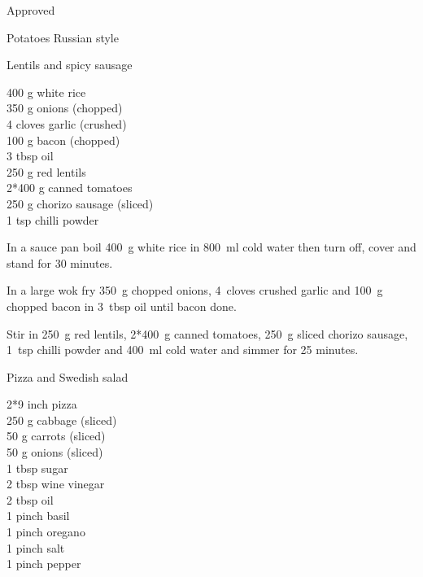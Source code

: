 \begin{menu}{Approved}
\begin{recipe}{2}{Potatoes Russian style}
\begin{instructions}
    \end{instructions}
    \end{recipe}%
  
    \begin{recipe}{2}{Lentils and spicy sausage}%
    
		\begin{ingredients}
		400 g white rice  \\
	350 g onions (chopped) \\
	4 cloves garlic (crushed) \\
	100 g bacon (chopped) \\
	3 tbsp oil  \\
	250 g red lentils  \\
	2*400 g canned tomatoes  \\
	250 g chorizo sausage (sliced) \\
	1 tsp chilli powder  \\
	
		\end{ingredients}
	
    \begin{instructions}
    \item 
      In a
      sauce pan
      boil
      400~g  white rice
      in
      800~ml  cold water
      then turn off, cover and stand for 30 minutes.
    \item 
        In a large wok fry
        350~g chopped onions,
        4~cloves crushed garlic
        and
        100~g chopped bacon
        in
        3~tbsp  oil
        until bacon done.
      \item 
        Stir in
        250~g  red lentils,
        2*400~g  canned tomatoes,
        250~g sliced chorizo sausage,
        1~tsp  chilli powder
        and
        400~ml  cold water
        and simmer for 25 minutes.
      
    \end{instructions}
    \end{recipe}%
  
    \begin{recipe}{1}{Pizza and Swedish salad}%
    
		\begin{ingredients}
		2*9 inch pizza  \\
	250 g cabbage (sliced) \\
	50 g carrots (sliced) \\
	50 g onions (sliced) \\
	1 tbsp sugar  \\
	2 tbsp wine vinegar  \\
	2 tbsp oil  \\
	1 pinch basil  \\
	1 pinch oregano  \\
	1 pinch salt  \\
	1 pinch pepper  \\
	

\end{ingredients}
\end{recipe}
\end{menu}

